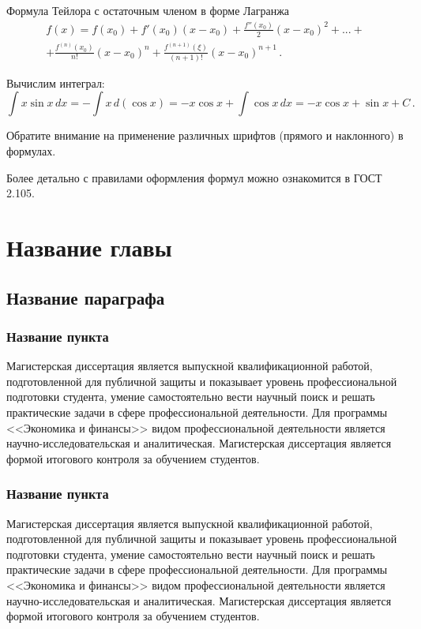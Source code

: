\documentclass[12pt,a4paper, oneside]{extreport}
\begin{document}
Формула Тейлора с остаточным членом в форме Лагранжа
	\begin{multline}
		f(x)=f(x_{0} )+f'(x_{0} )(x-x_{0} )+\frac{f''(x_{0} )}{2} (x-x_{0} )^{2} +...+\\
		+\frac{f^{(n)} (x_{0} )}{n!} (x-x_{0} )^{n} +\frac{f^{(n+1)} (\xi )}{(n+1)!} (x-x_{0} )^{n+1}\,.
	\end{multline}

Вычислим интеграл:
\begin{equation*}
\int x\sin  x\,dx=
-\int x\, d\left(\cos  x \right)=
-x \cos  x+\int \cos  x\,dx=
-x \cos  x+\sin  x+C\,.
\end{equation*}

Обратите внимание на применение различных шрифтов (прямого и наклонного) в формулах.

Более детально с правилами оформления формул можно ознакомится в ГОСТ 2.105.


\chapter{Название главы}

\section{Название параграфа}

\subsection{Название пункта}

Магистерская диссертация является выпускной квалификационной работой, подготовленной для публичной защиты и показывает уровень профессиональной подготовки студента, умение самостоятельно вести научный поиск и решать практические задачи в сфере профессиональной деятельности. Для программы <<Экономика и финансы>> видом профессиональной деятельности является научно-исследовательская и аналитическая. Магистерская диссертация является формой итогового контроля за обучением студентов.

\subsection{Название пункта}

Магистерская диссертация является выпускной квалификационной работой, подготовленной для публичной защиты и показывает уровень профессиональной подготовки студента, умение самостоятельно вести научный поиск и решать практические задачи в сфере профессиональной деятельности. Для программы <<Экономика и финансы>> видом профессиональной деятельности является научно-исследовательская и аналитическая. Магистерская диссертация является формой итогового контроля за обучением студентов.
\end{document}
